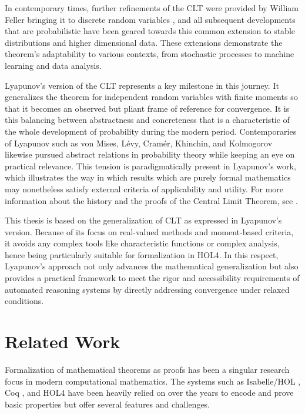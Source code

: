 In contemporary times, further refinements of the CLT were provided by William Feller bringing it to discrete random variables \cite{feller1945}, and all subsequent developments that are probabilistic have been geared towards this common extension to stable distributions and higher dimensional data. These extensions demonstrate the theorem’s adaptability to various contexts, from stochastic processes to machine learning and data analysis.

Lyapunov’s version of the CLT represents a key milestone in this journey. It generalizes the theorem for independent random variables with finite moments so that it becomes an observed but pliant frame of reference for convergence. It is this balancing between abstractness and concreteness that is a characteristic of the whole development of probability during the modern period. Contemporaries of Lyapunov such as von Mises, Lévy, Cramér, Khinchin, and Kolmogorov likewise pursued abstract relations in probability theory while keeping an eye on practical relevance. This tension is paradigmatically present in Lyapunov's work, which illustrates the way in which results which are purely formal mathematics may nonetheless satisfy external criteria of applicability and utility. For more information about the history and the proofs of the Central Limit Theorem, see \cite{fischer2011history, adams2009life}.

This thesis is based on the generalization of CLT as expressed in Lyapunov's version. Because of its focus on real-valued methods and moment-based criteria, it avoids any complex tools like characteristic functions or complex analysis, hence being particularly suitable for formalization in HOL4. In this respect, Lyapunov's approach not only advances the mathematical generalization but also provides a practical framework to meet the rigor and accessibility requirements of automated reasoning systems by directly addressing convergence under relaxed conditions.

\section{Related Work}

Formalization of mathematical theorems as proofs has been a singular research focus in modern computational mathematics. The systems such as Isabelle/HOL \citep{isabelle}, Coq \citep{bertot2013interactive}, and HOL4 \citep{slind2008brief} have been heavily relied on over the years to encode and prove basic properties but offer several features and challenges.

